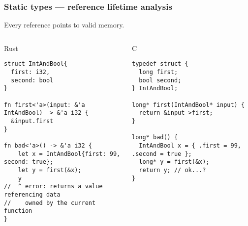 \documentclass[t]{beamer}
\begin{document}
\begin{frame}[fragile]
\frametitle{Static types --- reference lifetime analysis}

Every reference points to valid memory.

\begin{columns}

\begin{column}[T]{0.48\textwidth}
\begin{block}{Rust}
\tiny
\begin{verbatim}
struct IntAndBool{
  first: i32,
  second: bool
}

fn first<'a>(input: &'a IntAndBool) -> &'a i32 {
  &input.first
}

fn bad<'a>() -> &'a i32 {
    let x = IntAndBool{first: 99, second: true};
    let y = first(&x);
    y
//  ^ error: returns a value referencing data
//    owned by the current function
}
\end{verbatim}
\end{block}
\end{column}

\begin{column}[T]{0.48\textwidth}
\begin{block}{C}
\tiny
\begin{verbatim}
typedef struct {
  long first;
  bool second;
} IntAndBool;

long* first(IntAndBool* input) {
  return &input->first;
}

long* bad() {
  IntAndBool x = { .first = 99, .second = true };
  long* y = first(&x);
  return y; // ok...? 
}
\end{verbatim}
\end{block}
\end{column}

\end{columns}

\end{frame}
\end{document}
